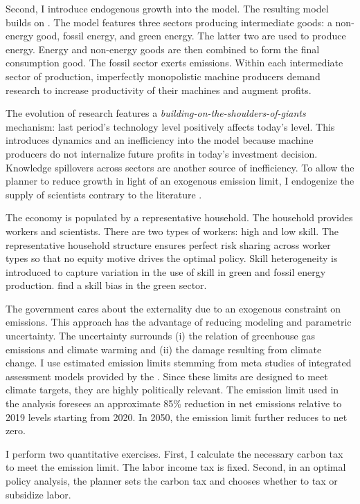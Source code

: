 Second, I introduce endogenous growth into the model. The resulting model builds on \cite{Fried2018ClimateAnalysis}. The model features three sectors producing intermediate goods:  a non-energy good, fossil energy, and green energy. The latter two are used to produce energy. Energy and non-energy goods are then combined to form the final consumption good. The fossil sector exerts emissions. Within each intermediate sector of production, imperfectly monopolistic machine producers demand research to increase productivity of their machines and augment profits.

The evolution of research features a \textit{building-on-the-shoulders-of-giants} mechanism: last period's technology level positively affects today's level. This introduces dynamics and an inefficiency into the model because machine producers do not internalize future profits in today's investment decision. Knowledge spillovers across sectors are another source of inefficiency. To allow the planner to reduce growth in light of an exogenous emission limit, I endogenize the supply of scientists contrary to the literature \citep{Acemoglu2012TheChange, Fried2018ClimateAnalysis}. 

The economy is populated by a representative household. The household provides workers and scientists. There are two types of workers: high and low skill. The representative household structure ensures perfect risk sharing across worker types so that no equity motive drives the optimal policy. 
Skill heterogeneity is introduced to capture variation in the use of skill in green and fossil energy production. \cite{Consoli2016DoCapital} find a skill bias in the green sector. 

The government cares about the externality due to an exogenous constraint on emissions. This approach has the advantage of reducing modeling and parametric uncertainty. The uncertainty surrounds (i) the relation of greenhouse gas emissions and climate warming and (ii) the damage resulting from climate change. I use estimated emission limits stemming from meta studies of integrated assessment models provided by the \cite{IPCC2022}. Since these limits are designed to meet climate targets, they are highly politically relevant.  
The emission limit used in the analysis foresees an approximate 85\% reduction in net emissions relative to 2019 levels starting from 2020. In 2050, the emission limit further reduces to net zero. 

I perform two quantitative exercises. First, I calculate the necessary carbon tax to meet the emission limit. The labor income tax is fixed. Second, in an optimal policy analysis, the planner sets the carbon tax and chooses whether to tax or subsidize labor.


